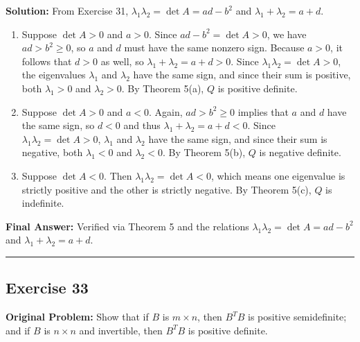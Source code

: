 \documentclass[11pt, letterpaper]{article}
\theoremstyle{definition}
\theoremstyle{remark}
\begin{document}
\textbf{Solution:}
From Exercise 31, $\lambda_1 \lambda_2 = \det A = ad - b^2$ and $\lambda_1 + \lambda_2 = a + d$.
\begin{enumerate}[label=\alph*.]
    \item Suppose $\det A > 0$ and $a > 0$. Since $ad - b^2 = \det A > 0$, we have $ad > b^2 \ge 0$, so $a$ and $d$ must have the same nonzero sign. Because $a > 0$, it follows that $d > 0$ as well, so $\lambda_1 + \lambda_2 = a + d > 0$. Since $\lambda_1 \lambda_2 = \det A > 0$, the eigenvalues $\lambda_1$ and $\lambda_2$ have the same sign, and since their sum is positive, both $\lambda_1 > 0$ and $\lambda_2 > 0$. By Theorem 5(a), $Q$ is positive definite.
    \item Suppose $\det A > 0$ and $a < 0$. Again, $ad > b^2 \ge 0$ implies that $a$ and $d$ have the same sign, so $d < 0$ and thus $\lambda_1 + \lambda_2 = a + d < 0$. Since $\lambda_1 \lambda_2 = \det A > 0$, $\lambda_1$ and $\lambda_2$ have the same sign, and since their sum is negative, both $\lambda_1 < 0$ and $\lambda_2 < 0$. By Theorem 5(b), $Q$ is negative definite.
    \item Suppose $\det A < 0$. Then $\lambda_1 \lambda_2 = \det A < 0$, which means one eigenvalue is strictly positive and the other is strictly negative. By Theorem 5(c), $Q$ is indefinite.
\end{enumerate}
\textbf{Final Answer:} Verified via Theorem 5 and the relations $\lambda_1\lambda_2 = \det A = ad-b^2$ and $\lambda_1+\lambda_2 = a+d$.

\medskip\hrule\medskip

\subsection*{Exercise 33}
\textbf{Original Problem:} Show that if $B$ is $m \times n$, then $B^T B$ is positive semidefinite; and if $B$ is $n \times n$ and invertible, then $B^T B$ is positive definite.
\end{document}
